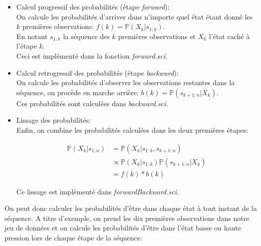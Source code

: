 \documentclass{article}
\begin{document}
\begin{multicols}{2}
\begin{itemize}
    \item Calcul progressif des probabilités (étape \emph{forward}): \\
        On calcule les probabilités d'arriver dans n'importe quel état étant
        donné les $k$ premières observations:
        $f(k) = \mathbb{P}(X_k | s_{1:k})$. \\
        En notant $s_{1:k}$ la séquence des $k$ premières observations et $X_k$
        l'état caché à l'étape $k$. \\
        Ceci est implémenté dans la fonction \emph{forward.sci}.
    \item Calcul retrogressif des probabilités (étape \emph{backward}): \\
        On calcule les probabilités d'observer les observations restantes dans
        la séquence, on procède en marche arrière:
        $b(k) = \mathbb{P}(s_{k + 1:n} | X_k)$. \\
        Ces probabilités sont calculées dans \emph{backward.sci}.
    \item Lissage des probabilités: \\
        Enfin, on combine les probabilités calculées dans les deux premières
        étapes:

        \begin{equation}
            \begin{split}
                \mathbb{P}(X_k | s_{1:n}) &= \mathbb{P}(X_k | s_{1:k}, s_{k + 1:n}) \\
                                          &\propto \mathbb{P}(X_k | s_{1:k}) \mathbb{P}(s_{k + 1:n} | X_k) \\
                                          &= f(k) * b(k)
            \end{split}
        \end{equation}

        Ce lissage est implémenté dans \emph{forwardBackward.sci}.
\end{itemize}

On peut donc calculer les probabilités d'être dans chaque état à tout instant
de la séquence. A titre d'exemple, on prend les dix premières observations dans
notre jeu de données et on calcule les probabilités d'être dans l'état basse ou
haute pression lors de chaque étape de la séquence:


\end{multicols}
\end{document}
